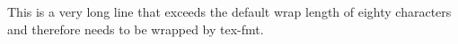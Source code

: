 
This is a very long line that exceeds the default wrap length of eighty characters and therefore needs to be wrapped by tex-fmt.

